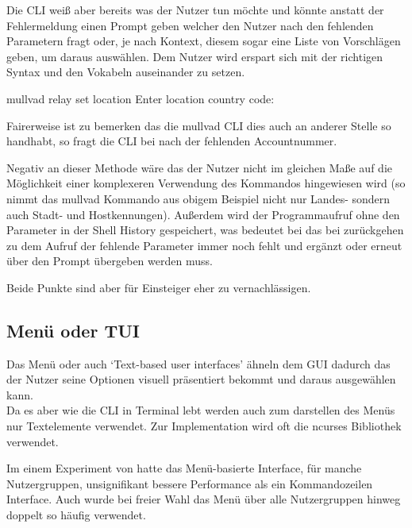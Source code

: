 \documentclass[oneside,bibliography=totocnumbered,BCOR=5mm]{scrbook}
\newenvironment{code}{\captionsetup{type=listing, skip=0pt}}{}
\begin{document}
Die CLI weiß aber bereits was der Nutzer tun möchte und könnte anstatt der
Fehlermeldung einen Prompt geben welcher den Nutzer nach den fehlenden
Parametern fragt \parencite{12factor} oder, je nach Kontext, diesem sogar eine
Liste von Vorschlägen geben, um daraus auswählen. Dem Nutzer wird erspart sich
mit der richtigen Syntax und den Vokabeln auseinander zu setzen.


\begin{code}
  \begin{shellcode}
mullvad relay set location
Enter location country code:
  \end{shellcode}
  \medskip
\end{code}

Fairerweise ist zu bemerken das die mullvad CLI dies auch an anderer Stelle
so handhabt, so fragt die CLI bei  nach der
fehlenden Accountnummer.

Negativ an dieser Methode wäre das der Nutzer nicht im gleichen Maße auf die
Möglichkeit einer komplexeren Verwendung des Kommandos hingewiesen wird (so
nimmt das mullvad Kommando aus obigem Beispiel nicht nur Landes- sondern auch
Stadt- und Hostkennungen). Außerdem wird der Programmaufruf ohne den Parameter
in der Shell History gespeichert, was bedeutet bei das bei zurückgehen zu dem
Aufruf der fehlende Parameter immer noch fehlt und ergänzt oder erneut über den
Prompt übergeben werden muss. %

Beide Punkte sind aber für Einsteiger eher zu vernachlässigen.

\subsection{Menü oder TUI}

Das Menü oder auch `Text-based user interfaces' ähneln dem GUI dadurch das der
Nutzer seine Optionen visuell präsentiert bekommt und daraus ausgewählen kann.
\\
Da es aber wie die CLI in Terminal lebt werden auch zum darstellen des Menüs
nur Textelemente verwendet. Zur Implementation wird oft die ncurses Bibliothek
verwendet.

\bigskip

Im einem Experiment von \cite{Westerman_1997} hatte das Menü-basierte
Interface, für manche Nutzergruppen, unsignifikant bessere Performance als
ein Kommandozeilen Interface. Auch wurde bei freier Wahl das Menü über alle
Nutzergruppen hinweg doppelt so häufig verwendet.
\end{document}
